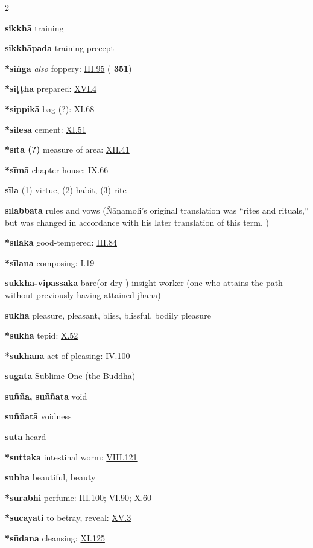 \begin{multicols}{2}
\begin{vismHanging}
\par\textbf{sikkhā} training
\par\textbf{sikkhāpada} training precept
\par\textbf{*siṅga} \emph{also }foppery: \hyperlink{III.95}{III.95}{} (\textbf{\cite{Vibh} 351})
\par\textbf{*siṭṭha} prepared: \hyperlink{XVI.4}{XVI.4}{}
\par\textbf{*sippikā} bag (?): \hyperlink{XI.68}{XI.68}{}
\par\textbf{*silesa} cement: \hyperlink{XI.51}{XI.51}{}
\par\textbf{*sīta (?)} measure of area: \hyperlink{XII.41}{XII.41}{}
\par\textbf{*sīmā} chapter house: \hyperlink{IX.66}{IX.66}{}
\par\textbf{sīla} (1) virtue, (2) habit, (3) rite
\par\textbf{sīlabbata} rules and vows (Ñāṇamoli’s original translation was “rites and rituals,” but was changed in accordance with his later translation of this term. ) 
\par\textbf{*sīlaka} good-tempered: \hyperlink{III.84}{III.84}{}
\par\textbf{*sīlana} composing: \hyperlink{I.19}{I.19}{}
\par\textbf{sukkha-vipassaka} bare(or dry-) insight worker (one who attains the path without previously having attained jhāna) 
\par\textbf{sukha} pleasure, pleasant, bliss, blissful, bodily pleasure
\par\textbf{*sukha} tepid: \hyperlink{X.52}{X.52}{}
\par\textbf{*sukhana} act of pleasing: \hyperlink{IV.100}{IV.100}{}
\par\textbf{sugata} Sublime One (the Buddha)
\par\textbf{suñña, suññata} void 
\par\textbf{suññatā} voidness 
\par\textbf{suta} heard
\par\textbf{*suttaka} intestinal worm: \hyperlink{VIII.121}{VIII.121}{}
\par\textbf{subha} beautiful, beauty
\par\textbf{*surabhi} perfume: \hyperlink{III.100}{III.100}{}; \hyperlink{VI.90}{VI.90}{}; \hyperlink{X.60}{X.60}{}
\par\textbf{*sūcayati} to betray, reveal: \hyperlink{XV.3}{XV.3}{}
\par\textbf{*sūdana} cleansing: \hyperlink{XI.125}{XI.125}{}

\end{vismHanging}
\end{multicols}
